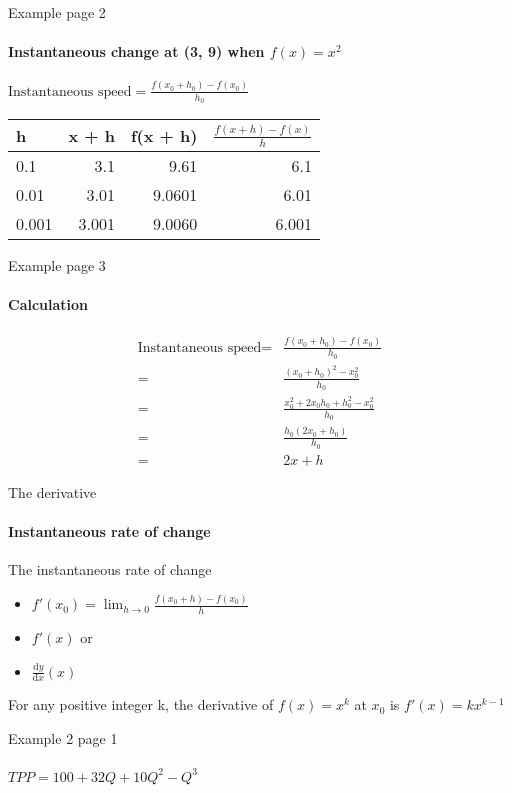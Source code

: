 \documentclass[14pt,xcolor=pdftex,dvipsnames,table]{beamer}
\begin{document}
\begin{frame}{Example page 2}
\framesubtitle{Instantaneous change at (3, 9) when $f(x) = x^2$}
$\text{Instantaneous speed} = \frac{f(x_0 + h_0) - f(x_0)}{h_0}$
\vskip 0.25cm
\begin{center}
\begin{tabular}{l r r r}
h & x + h & f(x + h) & $\frac{f(x +h) - f(x)}{h}$\\
\hline
0.1 & 3.1 & 9.61 & 6.1 \\
0.01 & 3.01 & 9.0601 & 6.01 \\
0.001 & 3.001 & 9.0060 & 6.001\\
\end{tabular}
\end{center}
\end{frame}

\begin{frame}{Example page 3}
\framesubtitle{Calculation}
\begin{align*}
\text{Instantaneous speed} = &\frac{f(x_0 + h_0) - f(x_0)}{h_0}\\
 = & \frac{(x_0 + h_0)^2 - x_0^2}{h_0}\\
 = & \frac{x_0^2 +2x_0h_0 + h_0^2 - x_0^2}{h_0}\\
 = & \frac{h_0(2x_0 + h_0)}{h_0}\\
 = & 2x + h
 \end{align*}
 \end{frame}
 
 \begin{frame}{The derivative}
 \framesubtitle{Instantaneous rate of change}
 The instantaneous rate of change 
 \pause
  \begin{itemize}[<+-| alert@+>]
 \item $f'(x_0) = \lim_{h \to 0} \frac{f(x_0 +h) - f(x_0)}{h}$
 \item $f'(x)$
 or
 \item $\frac{\mathrm d y}{\mathrm d x}(x)$
 \end{itemize}
 \pause
 \begin{block}{}
For any positive integer k, the derivative of $f(x) = x^k$ at $x_0$ is $f'(x) = kx^{k-1}$
\end{block}
\end{frame}

\begin{frame}{Example 2 page 1}
\framesubtitle{$TPP  = 100 + 32Q + 10Q^2 - Q^3$}
\end{frame}
\end{document}
